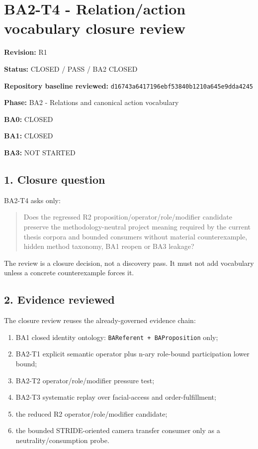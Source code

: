 \documentclass[11pt,a4paper]{article}
\providecommand{\tightlist}{\setlength{\itemsep}{0pt}\setlength{\parskip}{0pt}}
\begin{document}
\section{BA2-T4 - Relation/action vocabulary closure review}\label{ba2-t4---relationaction-vocabulary-closure-review}

\textbf{Revision:} R1

\textbf{Status:} CLOSED / PASS / BA2 CLOSED

\textbf{Repository baseline reviewed:} \texttt{d16743a6417196ebf53840b1210a645e9dda4245}

\textbf{Phase:} BA2 - Relations and canonical action vocabulary

\textbf{BA0:} CLOSED

\textbf{BA1:} CLOSED

\textbf{BA3:} NOT STARTED

\subsection{1. Closure question}\label{closure-question}

BA2-T4 asks only:

\begin{quote}
Does the regressed R2 proposition/operator/role/modifier candidate preserve the methodology-neutral project meaning required by the current thesis corpora and bounded consumers without material counterexample, hidden method taxonomy, BA1 reopen or BA3 leakage?
\end{quote}

The review is a closure decision, not a discovery pass. It must not add vocabulary unless a concrete counterexample forces it.

\subsection{2. Evidence reviewed}\label{evidence-reviewed}

The closure review reuses the already-governed evidence chain:

\begin{enumerate}
\def\labelenumi{\arabic{enumi}.}
\tightlist
\item
  BA1 closed identity ontology: \texttt{BAReferent\ +\ BAProposition} only;
\item
  BA2-T1 explicit semantic operator plus n-ary role-bound participation lower bound;
\item
  BA2-T2 operator/role/modifier pressure test;
\item
  BA2-T3 systematic replay over facial-access and order-fulfillment;
\item
  the reduced R2 operator/role/modifier candidate;
\item
  the bounded STRIDE-oriented camera transfer consumer only as a neutrality/consumption probe.
\end{enumerate}
\end{document}
